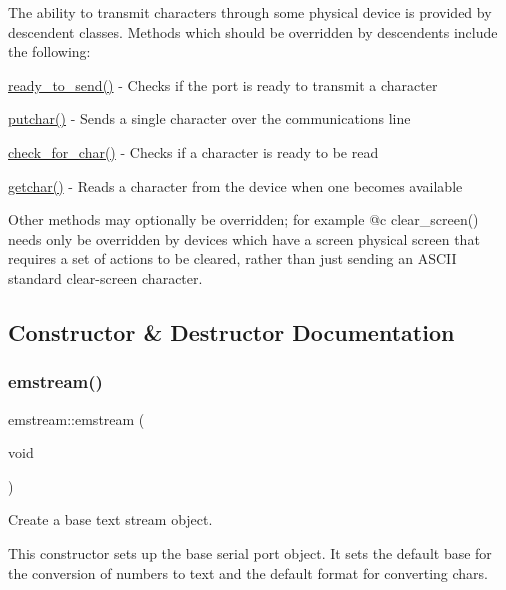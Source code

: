 The ability to transmit characters through some physical device is provided by descendent classes. Methods which should be overridden by descendents include the following\+: \begin{DoxyItemize}
\item {\ttfamily \mbox{\hyperlink{classemstream_a28149c19ad19d10d89ca8dd3d3803b1a}{ready\+\_\+to\+\_\+send()}}} -\/ Checks if the port is ready to transmit a character \item {\ttfamily \mbox{\hyperlink{classemstream_aa4dffc9aa58f601cc4153b4cbe65d757}{putchar()}}} -\/ Sends a single character over the communications line \item {\ttfamily \mbox{\hyperlink{classemstream_a64494c4283e4750d29d93df245045d56}{check\+\_\+for\+\_\+char()}}} -\/ Checks if a character is ready to be read \item {\ttfamily \mbox{\hyperlink{classemstream_a41f0814540d5baa7312310c59077a248}{getchar()}}} -\/ Reads a character from the device when one becomes available \begin{DoxyVerb} Other methods may optionally be overridden; for example @c clear_screen()
 needs only be overridden by devices which have a screen physical screen
 that requires a set of actions to be cleared, rather than just sending an
 ASCII standard clear-screen character. \end{DoxyVerb}
 \end{DoxyItemize}


\subsection{Constructor \& Destructor Documentation}
\mbox{\label{classemstream_ad19a1ff84926b5fd5feac71fc2f7fb51}} 
\subsubsection{\texorpdfstring{emstream()}{emstream()}}
{\footnotesize\ttfamily emstream\+::emstream (\begin{DoxyParamCaption}\item[{void}]{ }\end{DoxyParamCaption})}



Create a base text stream object. 

This constructor sets up the base serial port object. It sets the default base for the conversion of numbers to text and the default format for converting chars. 

